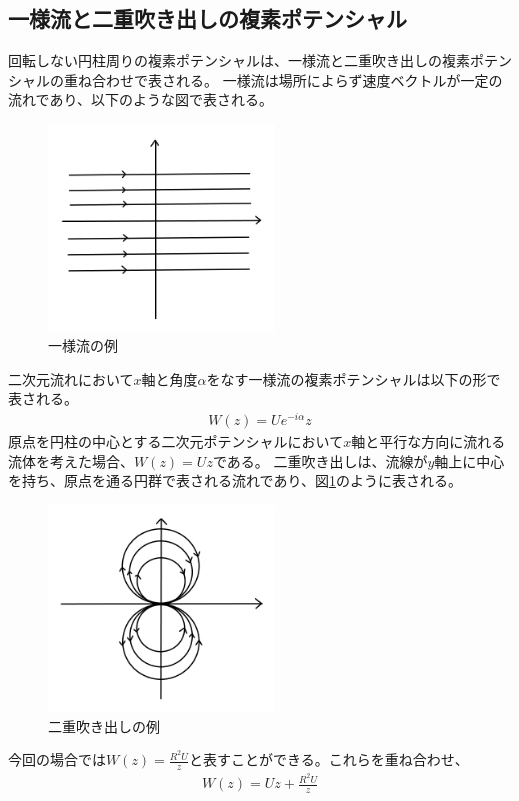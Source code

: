 \documentclass[10pt,b5paper,papersize,dvipdfmx]{jsbook}
\begin{document}
\subsection{一様流と二重吹き出しの複素ポテンシャル}
回転しない円柱周りの複素ポテンシャルは、一様流と二重吹き出しの複素ポテンシャルの重ね合わせで表される。
一様流は場所によらず速度ベクトルが一定の流れであり、以下のような図で表される。
\begin{figure}[ht]
  \centering
  \includegraphics[width=60mm]{img/ryuutai3.png}
  \caption{一様流の例}
\end{figure}
\par
二次元流れにおいて$x$軸と角度$\alpha$をなす一様流の複素ポテンシャルは以下の形で表される。
\begin{align}
  W(z) = Ue^{-i\alpha}z
\end{align}
原点を円柱の中心とする二次元ポテンシャルにおいて$x$軸と平行な方向に流れる流体を考えた場合、$W(z) = Uz$である。
二重吹き出しは、流線が$y$軸上に中心を持ち、原点を通る円群で表される流れであり、図\ref{fig:3}のように表される。
\begin{figure}[ht]
  \centering
  \includegraphics[width=60mm]{img/ryuutai2.png}
  \caption{二重吹き出しの例}
  \label{fig:3}
\end{figure}
今回の場合では$W(z) = \frac{R^2U}{z}$と表すことができる。これらを重ね合わせ、
\begin{align}
  W(z) = Uz + \frac{R^2U}{z}
\end{align}
\end{document}
